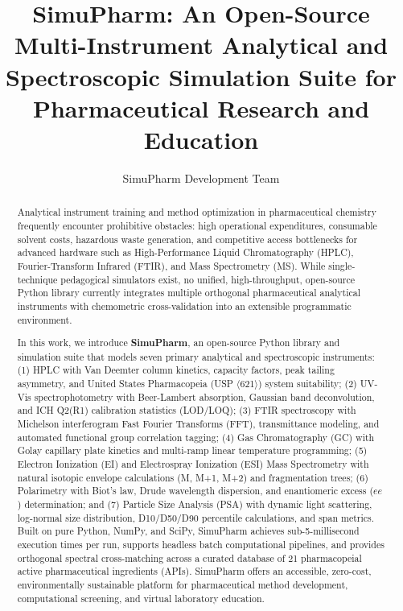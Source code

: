 \documentclass[final,5p,times,twocolumn]{elsarticle}
\begin{document}
\begin{frontmatter}

\title{SimuPharm: An Open-Source Multi-Instrument Analytical and Spectroscopic Simulation Suite for Pharmaceutical Research and Education}

\author[inst1]{SimuPharm Development Team}


\begin{abstract}
Analytical instrument training and method optimization in pharmaceutical chemistry frequently encounter prohibitive obstacles: high operational expenditures, consumable solvent costs, hazardous waste generation, and competitive access bottlenecks for advanced hardware such as High-Performance Liquid Chromatography (HPLC), Fourier-Transform Infrared (FTIR), and Mass Spectrometry (MS). While single-technique pedagogical simulators exist, no unified, high-throughput, open-source Python library currently integrates multiple orthogonal pharmaceutical analytical instruments with chemometric cross-validation into an extensible programmatic environment.

In this work, we introduce \textbf{SimuPharm}, an open-source Python library and simulation suite that models seven primary analytical and spectroscopic instruments: (1) HPLC with Van Deemter column kinetics, capacity factors, peak tailing asymmetry, and United States Pharmacopeia (USP $\langle$621$\rangle$) system suitability; (2) UV-Vis spectrophotometry with Beer-Lambert absorption, Gaussian band deconvolution, and ICH Q2(R1) calibration statistics (LOD/LOQ); (3) FTIR spectroscopy with Michelson interferogram Fast Fourier Transforms (FFT), transmittance modeling, and automated functional group correlation tagging; (4) Gas Chromatography (GC) with Golay capillary plate kinetics and multi-ramp linear temperature programming; (5) Electron Ionization (EI) and Electrospray Ionization (ESI) Mass Spectrometry with natural isotopic envelope calculations (M, M+1, M+2) and fragmentation trees; (6) Polarimetry with Biot's law, Drude wavelength dispersion, and enantiomeric excess ($ee$) determination; and (7) Particle Size Analysis (PSA) with dynamic light scattering, log-normal size distribution, D10/D50/D90 percentile calculations, and span metrics. Built on pure Python, NumPy, and SciPy, SimuPharm achieves sub-5-millisecond execution times per run, supports headless batch computational pipelines, and provides orthogonal spectral cross-matching across a curated database of 21 pharmacopeial active pharmaceutical ingredients (APIs). SimuPharm offers an accessible, zero-cost, environmentally sustainable platform for pharmaceutical method development, computational screening, and virtual laboratory education.
\end{abstract}


\end{frontmatter}
\end{document}
